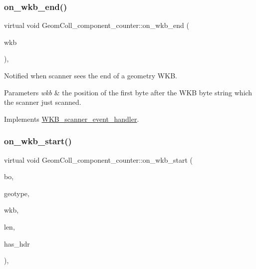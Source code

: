 \subsubsection{\texorpdfstring{on\+\_\+wkb\+\_\+end()}{on\_wkb\_end()}}
{\footnotesize\ttfamily virtual void Geom\+Coll\+\_\+component\+\_\+counter\+::on\+\_\+wkb\+\_\+end (\begin{DoxyParamCaption}\item[{const void $\ast$}]{wkb }\end{DoxyParamCaption})\hspace{0.3cm}{\ttfamily [inline]}, {\ttfamily [virtual]}}

Notified when scanner sees the end of a geometry W\+KB. 
\begin{DoxyParams}{Parameters}
{\em wkb} & the position of the first byte after the W\+KB byte string which the scanner just scanned. \\
\hline
\end{DoxyParams}


Implements \mbox{\hyperlink{classWKB__scanner__event__handler_a07c27cceefdd31f25f1d0b3754786b78}{W\+K\+B\+\_\+scanner\+\_\+event\+\_\+handler}}.

\mbox{\label{classGeomColl__component__counter_a6d1753bceb416c8ce84b0b761cc1a623}} 
\subsubsection{\texorpdfstring{on\+\_\+wkb\+\_\+start()}{on\_wkb\_start()}}
{\footnotesize\ttfamily virtual void Geom\+Coll\+\_\+component\+\_\+counter\+::on\+\_\+wkb\+\_\+start (\begin{DoxyParamCaption}\item[{Geometry\+::wkb\+Byte\+Order}]{bo,  }\item[{Geometry\+::wkb\+Type}]{geotype,  }\item[{const void $\ast$}]{wkb,  }\item[{uint32}]{len,  }\item[{bool}]{has\+\_\+hdr }\end{DoxyParamCaption})\hspace{0.3cm}{\ttfamily [inline]}, {\ttfamily [virtual]}}

